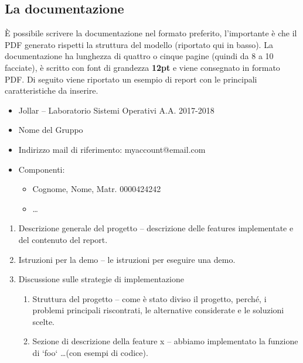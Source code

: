 \subsection{La documentazione}
È possibile scrivere la documentazione nel formato preferito, l'importante è che il PDF generato rispetti la struttura del modello (riportato qui in basso). La documentazione ha lunghezza di quattro o cinque pagine (quindi da 8 a 10 facciate), è scritto con font di grandezza \textbf{12pt} e viene consegnato in formato PDF. 
Di seguito viene riportato un esempio di report con le principali caratteristiche da inserire.
\begin{tcolorbox}[colback=green!20!white,colframe=green!75!black,title=L'intestazione del Report]
\begin{itemize}
    \item Jollar -- Laboratorio Sistemi Operativi A.A. 2017-2018
    \item Nome del Gruppo
    \item Indirizzo mail di riferimento: myaccount@email.com
    \item Componenti:
    \begin{itemize}
        \item Cognome, Nome, Matr. 0000424242
        \item \dots
    \end{itemize}
\end{itemize}
\end{tcolorbox}
\begin{tcolorbox}[colback=green!20!white,colframe=green!75!black,title=Il corpo del Report]
\begin{enumerate}
    \item Descrizione generale del progetto -- descrizione delle features implementate e del contenuto del report.
    \item Istruzioni per la demo -- le istruzioni per eseguire una demo.
    \item Discussione sulle strategie di implementazione 
    \begin{enumerate}
        \item Struttura del progetto -- come è stato diviso il progetto, perché, i problemi principali riscontrati, le alternative considerate e le soluzioni scelte.
        \item Sezione di descrizione della feature x -- abbiamo implementato la funzione di `foo` \dots (con esempi di codice).
    \end{enumerate}
\end{enumerate}
\end{tcolorbox}

